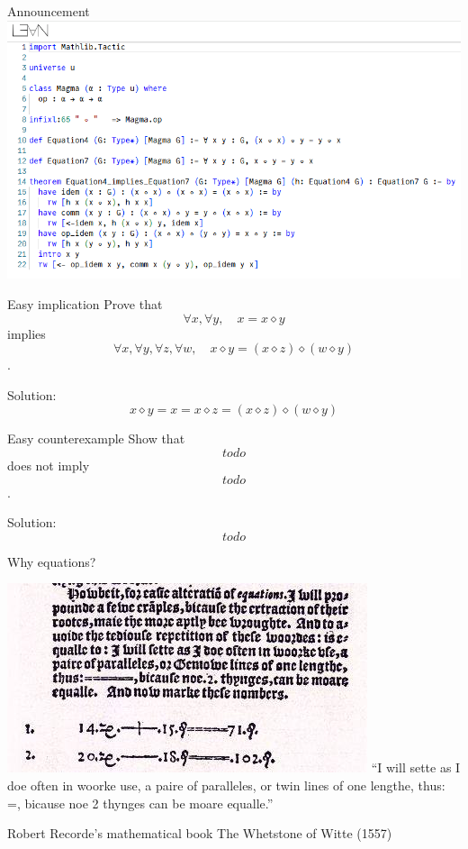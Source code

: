 \documentclass{beamer}
\newcommand{\op}{\diamond}
\begin{document}
\begin{frame}{Announcement}
\includegraphics[width=\textwidth]{initial_lean}
\end{frame}


\begin{frame}{Easy implication}
Prove that
$$ \forall x, \forall y,\quad x = x \op y $$
implies
$$ \forall x, \forall y, \forall z, \forall w,\quad x \op y = (x \op z)  \op (w \op y) $$
.

\pause
Solution:
$$ x \op y = x = x \op z = (x \op z) \op (w \op y) $$
\end{frame}


\begin{frame}{Easy counterexample}
Show that
$$ todo $$
does not imply
$$ todo $$
.

\pause
Solution:
$$ todo $$
\end{frame}


\begin{frame}{Why equations?}

\includegraphics[width=\textwidth]{eq_sign.png}
``I will sette as I doe often in woorke use, a paire of paralleles, or twin lines of one lengthe, thus: =, bicause noe 2 thynges can be moare equalle.''

Robert Recorde's mathematical book The Whetstone of Witte (1557)

\end{frame}
\end{document}

